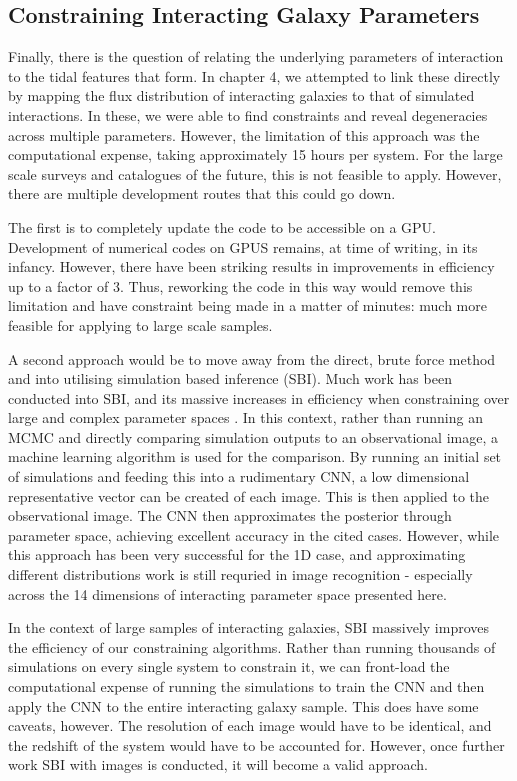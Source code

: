 \subsection{Constraining Interacting Galaxy Parameters}
\noindent Finally, there is the question of relating the underlying parameters of interaction to the tidal features that form. In chapter 4, we attempted to link these directly by mapping the flux distribution of interacting galaxies to that of simulated interactions. In these, we were able to find constraints and reveal degeneracies across multiple parameters. However, the limitation of this approach was the computational expense, taking approximately 15 hours per system. For the large scale surveys and catalogues of the future, this is not feasible to apply. However, there are multiple development routes that this could go down. 

The first is to completely update the code to be accessible on a GPU. Development of numerical codes on GPUS remains, at time of writing, in its infancy. However, there have been striking results in improvements in efficiency up to a factor of 3. Thus, reworking the code in this way would remove this limitation and have constraint being made in a matter of minutes: much more feasible for applying to large scale samples.

A second approach would be to move away from the direct, brute force method and into utilising simulation based inference (SBI). Much work has been conducted into SBI, and its massive increases in efficiency when constraining over large and complex parameter spaces \citep{Papers by Nial Jeffery}. In this context, rather than running an MCMC and directly comparing simulation outputs to an observational image, a machine learning algorithm is used for the comparison. By running an initial set of simulations and feeding this into a rudimentary CNN, a low dimensional representative vector can be created of each image. This is then applied to the observational image. The CNN then approximates the posterior through parameter space, achieving excellent accuracy in the cited cases. However, while this approach has been very successful for the 1D case, and approximating different distributions work is still requried in image recognition - especially across the 14 dimensions of interacting parameter space presented here. 

In the context of large samples of interacting galaxies, SBI massively improves the efficiency of our constraining algorithms. Rather than running thousands of simulations on every single system to constrain it, we can front-load the computational expense of running the simulations to train the CNN and then apply the CNN to the entire interacting galaxy sample. This does have some caveats, however. The resolution of each image would have to be identical, and the redshift of the system would have to be accounted for. However, once further work SBI with images is conducted, it will become a valid approach. 